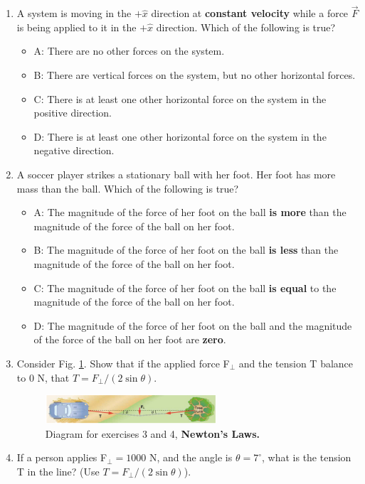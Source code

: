 \documentclass[10pt]{article}
\begin{document}
\begin{enumerate}
\begin{itemize}
\end{itemize}
\item A system is moving in the $+\hat{x}$ direction at \textbf{constant velocity} while a force $\vec{F}$ is being applied to it in the $+\hat{x}$ direction.  Which of the following is true?
\begin{itemize}
\item A: There are no other forces on the system.
\item B: There are vertical forces on the system, but no other horizontal forces.
\item C: There is at least one other horizontal force on the system in the positive direction.
\item D: There is at least one other horizontal force on the system in the negative direction.
\end{itemize}
\item A soccer player strikes a stationary ball with her foot.  Her foot has more mass than the ball.  Which of the following is true?
\begin{itemize}
\item A: The magnitude of the force of her foot on the ball \textbf{is more} than the magnitude of the force of the ball on her foot.
\item B: The magnitude of the force of her foot on the ball \textbf{is less} than the magnitude of the force of the ball on her foot.
\item C: The magnitude of the force of her foot on the ball \textbf{is equal} to the magnitude of the force of the ball on her foot.
\item D: The magnitude of the force of her foot on the ball and the magnitude of the force of the ball on her foot are \textbf{zero}.
\end{itemize}
\clearpage
\item Consider Fig. \ref{fig:car_pull}.  Show that if the applied force F$_{\perp}$ and the tension T balance to 0 N, that $T = F_{\perp}/(2\sin\theta)$. \vspace{2.5cm}
\begin{figure}
\centering
\includegraphics[width=0.6\textwidth]{figures/carpull.png}
\caption{\label{fig:car_pull} Diagram for exercises 3 and 4, \textbf{Newton's Laws.}}
\end{figure}
\item If a person applies F$_{\perp} = 1000$ N, and the angle is $\theta=7^{\circ}$, what is the tension T in the line?  (Use $T = F_{\perp}/(2\sin\theta)$). \vspace{2.5cm}

\end{enumerate}
\end{document}
